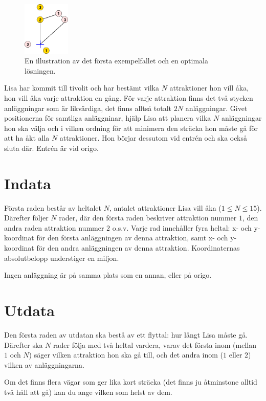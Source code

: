 \begin{figure}[h]
    \centering
    \includegraphics[width=0.2\textwidth]{tivoli}
    \caption{En illustration av det första exempelfallet och en optimala lösningen.}
\end{figure}
Lisa har kommit till tivolit och har bestämt vilka $N$ attraktioner hon vill åka, hon vill åka varje attraktion en gång.
För varje attraktion finns det två stycken anläggningar som är likvärdiga, det finns alltså totalt $2N$ anläggningar.
Givet positionerna för samtliga anläggninar, hjälp Lisa att planera vilka $N$ anläggningar hon ska välja och i vilken ordning för att minimera den sträcka hon måste gå för att ha åkt alla $N$ attraktioner.
Hon börjar dessutom vid entrén och ska också sluta där.
Entrén är vid origo.

\section*{Indata}
Första raden består av heltalet $N$, antalet attraktioner Lisa vill åka ($1 \le N \le 15$).
Därefter följer $N$ rader, där den första raden beskriver attraktion nummer $1$, den andra raden attraktion nummer $2$ o.s.v.
Varje rad innehåller fyra heltal: x- och y-koordinat för den första anläggningen av denna attraktion, samt x- och y-koordinat för den andra anläggningen av denna attraktion.
Koordinaternas absolutbelopp understiger en miljon.

Ingen anläggning är på samma plats som en annan, eller på origo.

\section*{Utdata}
Den första raden av utdatan ska bestå av ett flyttal: hur långt Lisa måste gå.
Därefter ska $N$ rader följa med två heltal vardera, varav det första inom (mellan $1$ och $N$) säger vilken attraktion hon ska gå till, och det andra inom ($1$ eller $2$) vilken av anläggningarna.

Om det finns flera vägar som ger lika kort sträcka (det finns ju åtminstone alltid två håll att gå) kan du ange vilken som helst av dem.

